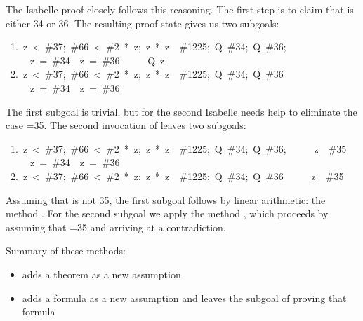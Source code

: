 The Isabelle proof closely follows this reasoning. The first 
step is to claim that  is either 34 or 36. The resulting proof 
state gives us two subgoals: 
\begin{isabelle}
\ 1.\ {\isasymlbrakk}z\ <\ \#37;\ \#66\ <\ \#2\ *\ z;\ z\ *\ z\ \isasymnoteq\ \#1225;\ Q\ \#34;\ Q\ \#36;\isanewline
\ \ \ \ \ z\ =\ \#34\ \isasymor\ z\ =\ \#36\isasymrbrakk\isanewline
\ \ \ \ \isasymLongrightarrow\ Q\ z\isanewline
\ 2.\ {\isasymlbrakk}z\ <\ \#37;\ \#66\ <\ \#2\ *\ z;\ z\ *\ z\ \isasymnoteq\ \#1225;\ Q\ \#34;\ Q\ \#36\isasymrbrakk\isanewline
\ \ \ \ \isasymLongrightarrow\ z\ =\ \#34\ \isasymor\ z\ =\ \#36
\end{isabelle}

The first subgoal is trivial, but for the second Isabelle needs help to eliminate
the case
=35.  The second invocation  of {} leaves two
subgoals: 
\begin{isabelle}
\ 1.\ {\isasymlbrakk}z\ <\ \#37;\ \#66\ <\ \#2\ *\ z;\ z\ *\ z\ \isasymnoteq\
\#1225;\ Q\ \#34;\ Q\ \#36;\isanewline
\ \ \ \ \ z\ \isasymnoteq\ \#35\isasymrbrakk\isanewline
\ \ \ \ \isasymLongrightarrow\ z\ =\ \#34\ \isasymor\ z\ =\ \#36\isanewline
\ 2.\ {\isasymlbrakk}z\ <\ \#37;\ \#66\ <\ \#2\ *\ z;\ z\ *\ z\ \isasymnoteq\ \#1225;\ Q\ \#34;\ Q\ \#36\isasymrbrakk\isanewline
\ \ \ \ \isasymLongrightarrow\ z\ \isasymnoteq\ \#35
\end{isabelle}

Assuming that  is not 35, the first subgoal follows by linear arithmetic:
the method {\isa{arith}}. For the second subgoal we apply the method \isa{force}, 
which proceeds by assuming that \isa{z}=35 and arriving at a contradiction.


\medskip
Summary of these methods:
\begin{itemize}
\item {} adds a theorem as a new assumption
\item {} adds a formula as a new assumption and leaves the
subgoal of proving that formula
\end{itemize}
